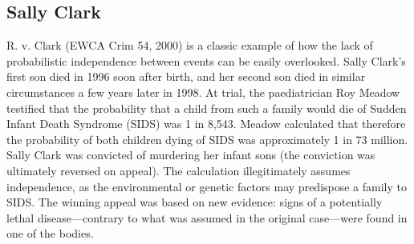 \documentclass[10pt,]{scrartcl}
\newcommand{\s}[1]{\mbox{\textsf{#1}}}
\begin{document}










\subsection{Sally Clark} \label{subsec:sc}




R. v. Clark (EWCA Crim 54, 2000) is a classic  example of how the lack of probabilistic independence between events can be easily overlooked. Sally Clark's first son died in 1996 soon after birth, and her second son died in similar circumstances a few years later in 1998.  At trial, the paediatrician Roy Meadow testified that the probability that a child from such a  family would die of Sudden Infant Death Syndrome (SIDS) was 1 in 8,543.  Meadow calculated that therefore the probability of both children dying of SIDS was approximately  1 in 73 million. Sally Clark was convicted of murdering her  infant sons (the conviction was ultimately reversed on appeal). The calculation illegitimately assumes independence,  as the  environmental or genetic factors may predispose a family to SIDS. The winning appeal was based on new evidence: signs of a potentially lethal disease---contrary to what was assumed in the original case---were found in one of the bodies. 
\end{document}

